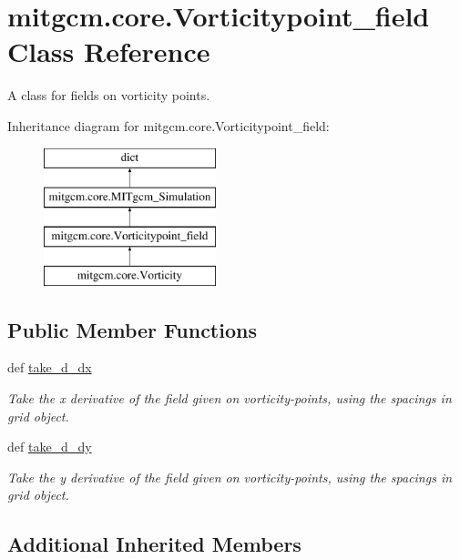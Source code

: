 \hypertarget{classmitgcm_1_1core_1_1Vorticitypoint__field}{}\section{mitgcm.\+core.\+Vorticitypoint\+\_\+field Class Reference}
\label{classmitgcm_1_1core_1_1Vorticitypoint__field}


A class for fields on vorticity points.  


Inheritance diagram for mitgcm.\+core.\+Vorticitypoint\+\_\+field\+:\begin{figure}[H]
\begin{center}
\leavevmode
\includegraphics[height=4.000000cm]{classmitgcm_1_1core_1_1Vorticitypoint__field}
\end{center}
\end{figure}
\subsection*{Public Member Functions}
\begin{DoxyCompactItemize}
\item 
def \hyperlink{classmitgcm_1_1core_1_1Vorticitypoint__field_ab7dd01f831fe81a7ce431625d54aa11f}{take\+\_\+d\+\_\+dx}
\begin{DoxyCompactList}\small\item\em Take the x derivative of the field given on vorticity-\/points, using the spacings in grid object. \end{DoxyCompactList}\item 
def \hyperlink{classmitgcm_1_1core_1_1Vorticitypoint__field_a1ac62e67431f0edfedfec642f3f5d3f3}{take\+\_\+d\+\_\+dy}
\begin{DoxyCompactList}\small\item\em Take the y derivative of the field given on vorticity-\/points, using the spacings in grid object. \end{DoxyCompactList}\end{DoxyCompactItemize}
\subsection*{Additional Inherited Members}


